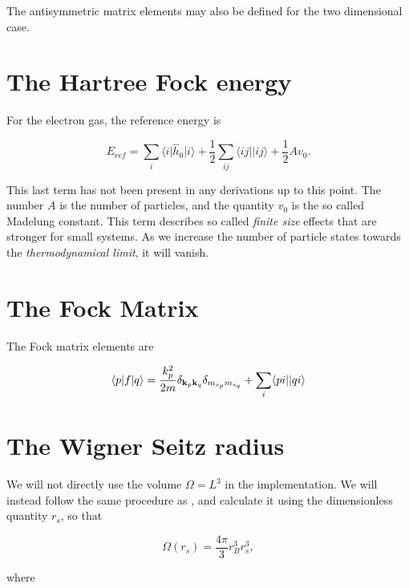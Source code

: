 The antisymmetric matrix elements may also be defined for the two dimensional case. \cite{Baardsen2014}

\section{The Hartree Fock energy}

For the electron gas, the reference energy is  \cite{Baardsen2014}

\begin{equation}
E_{ref} = \sum_i \langle i \vert \hat{h}_0 \vert i \rangle + \frac{1}{2} \sum_{ij} \langle ij \vert  \vert ij \rangle + \frac{1}{2} Av_0 .
\end{equation}

This last term has not been present in any derivations up to this point. The number $A$ is the number of particles, and the quantity $v_0$ is the so called Madelung constant. This term describes so called \emph{finite size} effects \cite{Baardsen2014} that are stronger for small systems. As we increase the number of particle states towards the \emph{thermodynamical limit}, it will vanish.

\section{The Fock Matrix}

The Fock matrix elements are \cite{Baardsen2014}

\begin{equation}
\langle p \vert f \vert q \rangle = \frac{k_p^2}{2m} \delta_{\bold{k}_p \bold{k}_q} \delta_{m_{s_p} m_{s_q}} + \sum_i  \langle pi \vert \vert qi \rangle 
\end{equation}

\FloatBarrier

\section{The Wigner Seitz radius}

We will not directly use the volume $\Omega = L^3$ in the implementation. We will instead follow the same procedure as \cite[p.105]{Baardsen2014}, and calculate it using the dimensionless quantity $r_s$, so that 

\begin{equation}
\Omega(r_s) = \frac{4 \pi}{3} r_B^3 r_s^3,
\end{equation}

where

